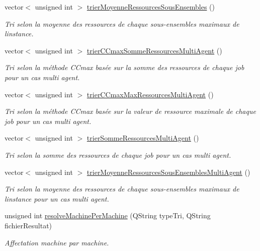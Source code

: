 \begin{DoxyCompactItemize}
vector$<$ unsigned int $>$ \hyperlink{classHeuristique_a4541884c49c13e08ee6c73c919388fd3}{trier\+Moyenne\+Ressources\+Sous\+Ensembles} ()
\begin{DoxyCompactList}\small\item\em Tri selon la moyenne des ressources de chaque sous-\/ensembles maximaux de l\textquotesingle{}instance. \end{DoxyCompactList}\item 
vector$<$ unsigned int $>$ \hyperlink{classHeuristique_aca0409bb9bab82ae4d47c13f3838d04d}{trier\+C\+Cmax\+Somme\+Ressources\+Multi\+Agent} ()
\begin{DoxyCompactList}\small\item\em Tri selon la méthode C\+Cmax basée sur la somme des ressources de chaque job pour un cas multi agent. \end{DoxyCompactList}\item 
vector$<$ unsigned int $>$ \hyperlink{classHeuristique_a177908d75131594fb1a37bd1a5b795f0}{trier\+C\+Cmax\+Max\+Ressources\+Multi\+Agent} ()
\begin{DoxyCompactList}\small\item\em Tri selon la méthode C\+Cmax basée sur la valeur de ressource maximale de chaque job pour un cas multi agent. \end{DoxyCompactList}\item 
vector$<$ unsigned int $>$ \hyperlink{classHeuristique_aadc8e02ca8aa127354993bb01910bcef}{trier\+Somme\+Ressources\+Multi\+Agent} ()
\begin{DoxyCompactList}\small\item\em Tri selon la somme des ressources de chaque job pour un cas multi agent. \end{DoxyCompactList}\item 
vector$<$ unsigned int $>$ \hyperlink{classHeuristique_a7dcb7f68553d90195c39950ed456e266}{trier\+Moyenne\+Ressources\+Sous\+Ensembles\+Multi\+Agent} ()
\begin{DoxyCompactList}\small\item\em Tri selon la moyenne des ressources de chaque sous-\/ensembles maximaux de l\textquotesingle{}instance pour un cas multi agent. \end{DoxyCompactList}\item 
unsigned int \hyperlink{classHeuristique_ad8a57ed34b0c46f6d65e501ee99da498}{resolve\+Machine\+Per\+Machine} (Q\+String type\+Tri, Q\+String fichier\+Resultat)
\begin{DoxyCompactList}\small\item\em Affectation machine par machine. \end{DoxyCompactList}\item 

\end{DoxyCompactItemize}
